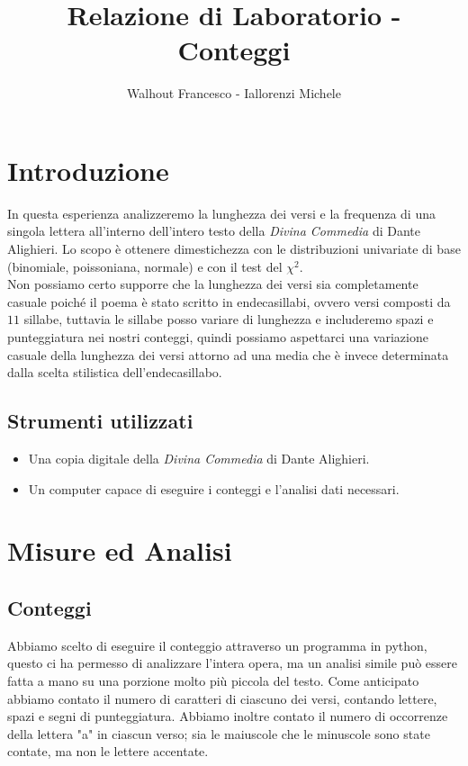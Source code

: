 \documentclass[a4paper]{article}
\title{Relazione di Laboratorio - Conteggi}
\author{Walhout Francesco - Iallorenzi Michele}
\begin{document}
    \maketitle

    \section{Introduzione}
        In questa esperienza analizzeremo la lunghezza dei versi e la frequenza di una
        singola lettera all'interno dell'intero testo della \emph{Divina Commedia} di 
        Dante Alighieri. Lo scopo è ottenere dimestichezza con le distribuzioni
        univariate di base (binomiale, poissoniana, normale) e con il test del $\chi^2$.\\
        Non possiamo certo supporre che la lunghezza dei versi sia completamente casuale
        poiché il poema è stato scritto in endecasillabi, ovvero versi composti da $11$ 
        sillabe, tuttavia le sillabe posso variare di lunghezza e includeremo spazi e 
        punteggiatura nei nostri conteggi, quindi possiamo aspettarci una variazione
        casuale della lunghezza dei versi attorno ad una media che è invece determinata
        dalla scelta stilistica dell'endecasillabo.
    \subsection{Strumenti utilizzati}
    \begin{itemize}
        \item Una copia digitale della  \emph{Divina Commedia} di Dante Alighieri.
        \item Un computer capace di eseguire i conteggi e l'analisi dati necessari.
    \end{itemize}

    \section{Misure ed Analisi}
    \subsection{Conteggi}
        Abbiamo scelto di eseguire il conteggio attraverso un programma in python, questo
        ci ha permesso di analizzare l'intera opera, ma un analisi simile può essere fatta
        a mano su una porzione molto più piccola del testo.
        Come anticipato abbiamo contato il numero di caratteri di ciascuno dei
        versi, contando lettere, spazi e segni di punteggiatura.
        Abbiamo inoltre contato il numero di occorrenze della lettera "a" in ciascun
        verso; sia le maiuscole che le minuscole sono state contate, ma non le lettere 
        accentate.
\end{document}
